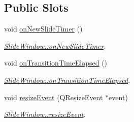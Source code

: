 \subsection*{Public Slots}
\begin{DoxyCompactItemize}
\item 
\mbox{\label{classSlideWindow_a00d414f2a025498be0e9c3966b078072}} 
void \mbox{\hyperlink{classSlideWindow_a00d414f2a025498be0e9c3966b078072}{on\+New\+Slide\+Timer}} ()
\begin{DoxyCompactList}\small\item\em \mbox{\hyperlink{classSlideWindow_a00d414f2a025498be0e9c3966b078072}{Slide\+Window\+::on\+New\+Slide\+Timer}}. \end{DoxyCompactList}\item 
\mbox{\label{classSlideWindow_a05c8b1e7899c0d3d1577b3a86739a7ca}} 
void \mbox{\hyperlink{classSlideWindow_a05c8b1e7899c0d3d1577b3a86739a7ca}{on\+Transition\+Time\+Elapsed}} ()
\begin{DoxyCompactList}\small\item\em \mbox{\hyperlink{classSlideWindow_a05c8b1e7899c0d3d1577b3a86739a7ca}{Slide\+Window\+::on\+Transition\+Time\+Elapsed}}. \end{DoxyCompactList}\item 
void \mbox{\hyperlink{classSlideWindow_ab5c3808fd4f64a3763245be30cfde5f2}{resize\+Event}} (Q\+Resize\+Event $\ast$event)
\begin{DoxyCompactList}\small\item\em \mbox{\hyperlink{classSlideWindow_ab5c3808fd4f64a3763245be30cfde5f2}{Slide\+Window\+::resize\+Event}}. \end{DoxyCompactList}\end{DoxyCompactItemize}
